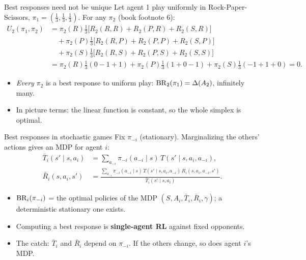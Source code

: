 \documentclass[aspectratio=169,11pt]{beamer}
\begin{document}
\begin{frame}{Best responses need not be unique}
  Let agent 1 play uniformly in Rock-Paper-Scissors, $\pi_1 = (\tfrac13, \tfrac13, \tfrac13)$. For any $\pi_2$ (book footnote 6):
  \begin{align*}
    U_2(\pi_1, \pi_2)
    &= \pi_2(R) \tfrac13 \big[ R_2(R,R) + R_2(P,R) + R_2(S,R) \big] \\
    &\quad + \pi_2(P) \tfrac13 \big[ R_2(R,P) + R_2(P,P) + R_2(S,P) \big] \\
    &\quad + \pi_2(S) \tfrac13 \big[ R_2(R,S) + R_2(P,S) + R_2(S,S) \big] \\
    &= \pi_2(R) \tfrac13 (0 - 1 + 1) + \pi_2(P) \tfrac13 (1 + 0 - 1) + \pi_2(S) \tfrac13 (-1 + 1 + 0) = 0.
  \end{align*}
  \begin{itemize}
    \item \emph{Every} $\pi_2$ is a best response to uniform play: $\operatorname{BR}_2(\pi_1) = \Delta(A_2)$, infinitely many.
    \item In picture terms: the linear function is constant, so the whole simplex is optimal.
  \end{itemize}
\end{frame}

\begin{frame}{Best responses in stochastic games}
  Fix $\pi_{-i}$ (stationary). Marginalizing the others' actions gives an MDP for agent $i$:
  \begin{align*}
    \bar T_i(s' \mid s, a_i) &= \sum_{a_{-i}} \pi_{-i}(a_{-i} \mid s)\, T(s' \mid s, a_i, a_{-i}), \\
    \bar R_i(s, a_i, s') &= \frac{\sum_{a_{-i}} \pi_{-i}(a_{-i} \mid s)\, T(s' \mid s, a_i, a_{-i})\, R_i(s, a_i, a_{-i}, s')}{\bar T_i(s' \mid s, a_i)} .
  \end{align*}
  \begin{itemize}
    \item $\operatorname{BR}_i(\pi_{-i})$ = the optimal policies of the MDP $(S, A_i, \bar T_i, \bar R_i, \gamma)$; a deterministic stationary one exists.
    \item Computing a best response is \textbf{single-agent RL} against fixed opponents.
    \item The catch: $\bar T_i$ and $\bar R_i$ depend on $\pi_{-i}$. If the others change, so does agent $i$'s MDP.
  \end{itemize}
\end{frame}

\end{document}
